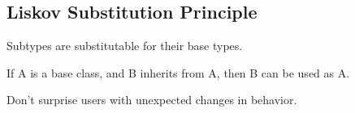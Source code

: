 \documentclass[xcolor=svgnames]{beamer}
\begin{document}

\subsection{Liskov Substitution Principle}


\begin{frame}{\subsecname}
Subtypes are substitutable for their base types. \pause

If A is a base class, and B inherits from A, then B can be used as A.\pause

Don't surprise users with unexpected changes in behavior.
\end{frame}


\begin{frame}{\subsecname}

    \begin{minipage}{\columnwidth}
    \end{minipage}

\end{frame}


\begin{frame}{\subsecname}

    \begin{minipage}{\columnwidth}
    \end{minipage}

\end{frame}


\begin{frame}{\subsecname}

    \begin{minipage}{\columnwidth}
    \end{minipage}

\end{frame}

\end{document}
